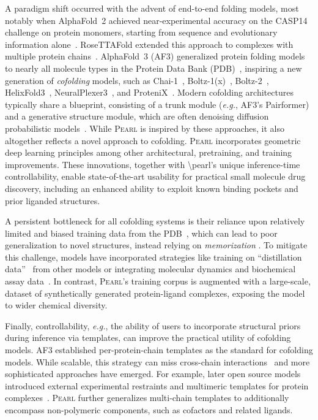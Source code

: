\documentclass[11pt, letterpaper, onecolumn]{tau-class/tau}
\newcommand{\pearl}{\textsc{Pearl}\xspace}
\newcommand{\alphafold}[1]{AlphaFold~#1\xspace}
\newcommand{\boltz}[1]{\mbox{Boltz-#1\xspace}}
\newcommand{\chai}[1]{\mbox{Chai-#1\xspace}}
\newcommand{\protenix}{ProteniX\xspace}
\newcommand{\eg}{\textit{e.g.}\xspace}
\begin{document}
A paradigm shift occurred with the advent of end-to-end folding models, most notably when \alphafold2 achieved near-experimental accuracy on the CASP14 challenge on protein monomers, starting from sequence and evolutionary information alone~\cite{af2,casp14}.
RoseTTAFold extended this approach to complexes with multiple protein chains~\cite{rosettafold2021}.
\alphafold3 (AF3) \cite{abramson2024accurate} generalized protein folding models to nearly all molecule types in the Protein Data Bank (PDB)~\cite{wwpdb_stats_2025}, inspiring a new generation of \emph{cofolding} models, such as
\chai1~\cite{chai2024chai},
\boltz1(x)~\cite{wohlwend2024boltz1},
\boltz2~\cite{passaro2025boltz2},
HelixFold3~\cite{liu2024helixfold3},
NeuralPlexer3~\cite{qiao2024neuralplexer3}, and
\protenix~\cite{bytedance2025protenix}.
Modern cofolding architectures typically share a blueprint, consisting of a trunk module (\eg, AF3's Pairformer) and a generative structure module, which are often denoising diffusion probabilistic models~\cite{diffusion}.
While \pearl is inspired by these approaches, it also altogether reflects a novel approach to cofolding.
\pearl incorporates geometric deep learning principles \cite{bronstein2017geometric} among other architectural, pretraining, and training improvements.
These innovations, together with \textbackslash{}pearl's unique inference-time controllability, enable state-of-the-art usability for practical small molecule drug discovery, including an enhanced ability to exploit known binding pockets and prior liganded structures.

A persistent bottleneck for all cofolding systems is their reliance upon relatively limited and biased training data from the PDB~\cite{burley2025updated}, which can lead to poor generalization to novel structures, instead relying on \emph{memorization} \cite{vskrinjar2025have}.
To mitigate this challenge, models have incorporated strategies like training on ``distillation data''~\cite{Melnyk2025} from other models \cite{ahdritz2024openfold} or integrating molecular dynamics and biochemical assay data~\cite{passaro2025boltz2}.
In contrast, \pearl's training corpus is augmented with a large-scale, dataset of synthetically generated protein-ligand complexes, exposing the model to wider chemical diversity.

Finally, controllability, \eg, the ability of users to incorporate structural priors during inference via templates, can improve the practical utility of cofolding models.
AF3 established per-protein-chain templates as the standard for cofolding models.
While scalable, this strategy can miss cross-chain interactions~\cite{abramson2024accurate} and more sophisticated approaches have emerged.
For example, later open source models introduced external experimental restraints and multimeric templates for protein complexes~\cite{chai2024chai,passaro2025boltz2}.
\pearl further generalizes multi-chain templates to additionally encompass non-polymeric components, such as cofactors and related ligands.
\end{document}
